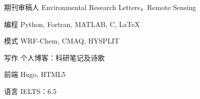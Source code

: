 
\begin{cvskills}

  \cvskill
    {期刊审稿人} %
    {Environmental Research Letters，Remote Sensing} %

  \cvskill
    {编程} %
    {Python, Fortran, MATLAB, C, \LaTeX} %

  \cvskill
    {模式} %
    {WRF-Chem, CMAQ, HYSPLIT} %

  \cvskill
    {写作} %
    {个人博客：科研笔记及诗歌} %

  \cvskill
    {前端} %
    {Hugo, HTML5} %

  \cvskill
    {语言} %
    {IELTS：6.5} %

\end{cvskills}
